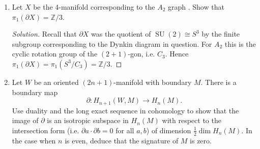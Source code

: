 \documentclass{article}
\theoremstyle{definition}
\DeclareMathOperator{\SU}{SU}
\newcommand{\CP}{\mathbb{CP}}
\newcommand{\Z}{\mathbb{Z}}
\begin{document}
\begin{enumerate}
\begin{proof}[Solution]
\begin{itemize}
                \item For $\CP^2\#\overline{\CP^2}$, we have almost exactly the
                    same story as for $\CP^2\#\CP^2$, except the
                    self-intersection of a line in $\overline{\CP^2}$ is $-1$,
                    so the intersection form is given by
                    \begin{equation*}
                        Q_{\CP^2\#\overline{\CP^2}} = \begin{pmatrix}
                            1 & 0 \\ 0 & -1
                        \end{pmatrix}.
                    \end{equation*}
            \end{itemize}
            Now these matrices are not congruent; $Q_{\CP^2\#\CP^2}$ is
            positive-definite, while the others are indefinite, and
            $Q_{S^2\times S^2}$ is even, while $Q_{\CP^2\#\overline{\CP^2}}$ is
            odd. Hence we see that the manifolds are not homeomorphic.

            However, note that $(S^2\times S^2)\#\overline{\CP^2}
            =(\CP^1\times\CP^1)\#\overline{\CP^2}$ is the blow-up of
            $\CP^1\times\CP^1$ at a point, while
            $\CP^2\#\overline{\CP^2}\#\overline{\CP^2}$ is the blow-up of
            $\CP^2$ at two points. From what we saw in the section on blowing
            up these are isomorphic complex varieties, and therefore
            homeomorphic manifolds.
        \end{proof}

    \item Let $X$ be the 4-manifold corresponding to the $A_2$ graph
        . Show that $\pi_1(\partial X)=\Z/3$.

        \begin{proof}[Solution]
            Recall that $\partial X$ was the quotient of $\SU(2)\cong S^3$ by
            the finite subgroup corresponding to the Dynkin diagram in question.
            For $A_2$ this is the cyclic rotation group of the $(2+1)$-gon, i.e.
            $C_3$. Hence $\pi_1(\partial X)=\pi_1(S^3/C_3)=\Z/3$.
        \end{proof}

    \item Let $W$ be an oriented $(2n+1)$-manifold with boundary $M$. There is a
        boundary map
        \begin{equation*}
            \partial:H_{n+1}(W,M)\to H_n(M).
        \end{equation*}
        Use duality and the long exact sequence in cohomology to show that the
        image of $\partial$ is an isotropic subspace in $H_n(M)$ with respect to
        the intersection form (i.e. $\partial a\cdot\partial b=0$ for all $a,b$)
        of dimension $\frac{1}{2}\dim H_n(M)$. In the case when $n$ is even,
        deduce that the signature of $M$ is zero.


\end{enumerate}
\end{document}
